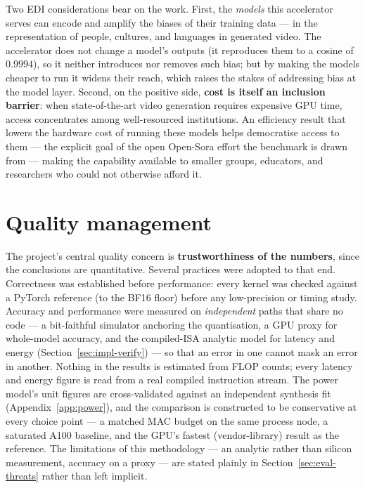 \documentclass[11pt]{report}
\begin{document}
Two EDI considerations bear on the work. First, the \emph{models} this
accelerator serves can encode and amplify the biases of their training data
--- in the representation of people, cultures, and languages in generated
video. The accelerator does not change a model's outputs (it reproduces them
to a cosine of $0.9994$), so it neither introduces nor removes such bias; but
by making the models cheaper to run it widens their reach, which raises the
stakes of addressing bias at the model layer. Second, on the positive side,
\textbf{cost is itself an inclusion barrier}: when state-of-the-art video
generation requires expensive GPU time, access concentrates among
well-resourced institutions. An efficiency result that lowers the hardware
cost of running these models helps democratise access to them --- the
explicit goal of the open Open-Sora effort the benchmark is drawn from ---
making the capability available to smaller groups, educators, and
researchers who could not otherwise afford it.

\section{Quality management}

The project's central quality concern is \textbf{trustworthiness of the
numbers}, since the conclusions are quantitative. Several practices were
adopted to that end. Correctness was established before performance: every
kernel was checked against a PyTorch reference (to the BF16 floor) before any
low-precision or timing study. Accuracy and performance were measured on
\emph{independent} paths that share no code --- a bit-faithful simulator
anchoring the quantisation, a GPU proxy for whole-model accuracy, and the
compiled-ISA analytic model for latency and energy
(Section~\ref{sec:impl-verify}) --- so that an error in one cannot mask an
error in another. Nothing in the results is estimated from FLOP counts;
every latency and energy figure is read from a real compiled instruction
stream. The power model's unit figures are cross-validated against an
independent synthesis fit (Appendix~\ref{app:power}), and the comparison is
constructed to be conservative at every choice point --- a matched MAC budget
on the same process node, a saturated A100 baseline, and the GPU's fastest
(vendor-library) result as the reference. The limitations of this
methodology --- an analytic rather than silicon measurement, accuracy on a
proxy --- are stated plainly in Section~\ref{sec:eval-threats} rather than
left implicit.
\end{document}

